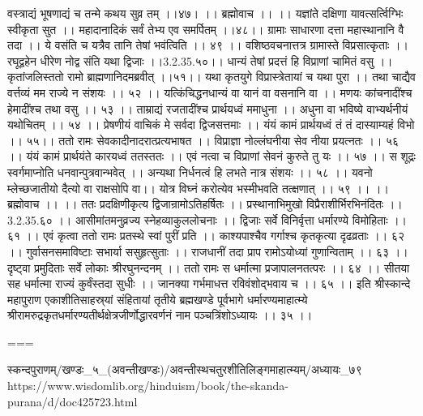 वस्त्राद्यं भूषणाद्यं च तन्मे कथय सुव्र तम् ।।४७। ।।
ब्रह्मोवाच ।। ।।
यज्ञांते दक्षिणा यावत्सर्त्विग्भिः स्वीकृता सुत ।।
महादानादिकं सर्वं तेभ्य एव समर्पितम् ।।४८।।
ग्रामाः साधारणा दत्ता महास्थानानि वै तदा ।।
ये वसंति च यत्रैव तानि तेषां भवंत्विति ।। ४९ ।।
वशिष्ठवचनात्तत्र ग्रामास्ते विप्रसात्कृताः ।।
रघूद्वहेन धीरेण नोद्व संति यथा द्विजाः ।।3.2.35.५०।।
धान्यं तेषां प्रदत्तं हि विप्राणां चामितं वसु ।।
कृतांजलिस्ततो रामो ब्राह्मणानिदमब्रवीत् ।।५१।।
यथा कृतयुगे विप्रास्त्रेतायां च यथा पुरा ।।
तथा चाद्यैव वर्त्तव्यं मम राज्ये न संशयः ।। ५२ ।।
यत्किंचिद्धनधान्यं वा यानं वा वसनानि वा ।।
मणयः कांचनादींश्च हेमादींश्च तथा वसु ।। ५३ ।।
ताम्राद्यं रजतादींश्च प्रार्थयध्वं ममाधुना ।।
अधुना वा भविष्ये वाभ्यर्थनीयं यथोचितम् ।। ५४ ।।
प्रेषणीयं वाचिकं मे सर्वदा द्विजसत्तमाः ।।
यंयं कामं प्रार्थयध्वं तं तं दास्याम्यहं विभो ।। ५५।।
ततो रामः सेवकादीनादरात्प्रत्यभाषत ।।
विप्राज्ञा नोल्लंघनीया सेव नीया प्रयत्नतः ।। ५६ ।।
यंयं कामं प्रार्थयंते कारयध्वं ततस्ततः ।।
एवं नत्वा च विप्राणां सेवनं कुरुते तु यः ।। ५७ ।।
स शूद्रः स्वर्गमाप्नोति धनवान्पुत्रवान्भवेत् ।।
अन्यथा निर्धनत्वं हि लभते नात्र संशयः ।। ५८ ।।
यवनो म्लेच्छजातीयो दैत्यो वा राक्षसोपि वा।।
योत्र विघ्नं करोत्येव भस्मीभवति तत्क्षणात् ।। ५९ ।।
।। ब्रह्मोवाच ।। ।।
ततः प्रदक्षिणीकृत्य द्विजान्रामोऽतिहर्षितः ।।
प्रस्थानाभिमुखो विप्रैराशीर्भिरभिनंदितः ।। 3.2.35.६० ।।
आसीमांतमनुव्रज्य स्नेहव्याकुललोचनाः ।।
द्विजाः सर्वे विनिर्वृत्ता धर्मारण्ये विमोहिताः ।। ६१ ।।
एवं कृत्वा ततो रामः प्रतस्थे स्वां पुरीं प्रति ।।
काश्यपाश्चैव गर्गाश्च कृतकृत्या दृढव्रताः ।। ६२ ।।
गुर्वासनसमाविष्टाः सभार्या ससुहृत्सुताः ।।
राजधानीं तदा प्राप रामोऽयोध्यां गुणान्विताम् ।। ६३ ।।
दृष्ट्वा प्रमुदिताः सर्वे लोकाः श्रीरघुनन्दनम् ।।
ततो रामः स धर्मात्मा प्रजापालनतत्परः ।। ६४ ।।
सीतया सह धर्मात्मा राज्यं कुर्वंस्तदा सुधीः ।।
जानक्या गर्भमाधत्त रविवंशोद्भवाय च ।। ६५ ।।
इति श्रीस्कान्दे महापुराण एकाशीतिसाहस्र्यां संहितायां तृतीये ब्रह्मखण्डे पूर्वभागे धर्मारण्यमाहात्म्ये श्रीरामरुद्रकृतधर्मारण्यतीर्थक्षेत्रजीर्णोद्धारवर्णनं नाम पञ्चत्रिंशोऽध्यायः ।। ३५ ।।

===

स्कन्दपुराणम्/खण्डः_५_(अवन्तीखण्डः)/अवन्तीस्थचतुरशीतिलिङ्गमाहात्म्यम्/अध्यायः_७९
https://www.wisdomlib.org/hinduism/book/the-skanda-purana/d/doc425723.html


